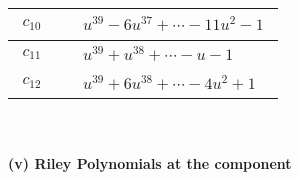 \documentclass[1p]{elsarticle_modified}
\theoremstyle{definition}
\begin{document}
\begin{tabular}{m{50pt}|m{274pt}}
\hline $$\begin{aligned}c_{10}\end{aligned}$$&$\begin{aligned}
&u^{39}-6 u^{37}+\cdots-11 u^2-1
\end{aligned}$\\
\hline $$\begin{aligned}c_{11}\end{aligned}$$&$\begin{aligned}
&u^{39}+u^{38}+\cdots- u-1
\end{aligned}$\\
\hline $$\begin{aligned}c_{12}\end{aligned}$$&$\begin{aligned}
&u^{39}+6 u^{38}+\cdots-4 u^2+1
\end{aligned}$\\
\hline
\end{tabular}\\~\\
\newpage\renewcommand{\arraystretch}{1}
\flushleft \textbf{(v) Riley Polynomials at the component}\newline \\
\end{document}
